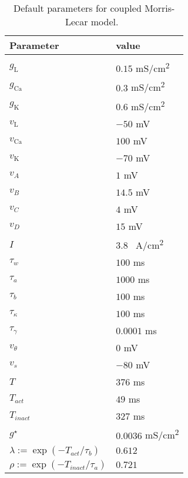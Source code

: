\documentclass[utf8]{frontiers_suppmat} %
\renewcommand{\k}{\mathrm{K}}
\newcommand{\ca}{\mathrm{Ca}}
\newcommand{\leak}{\mathrm{L}}
\newcommand{\gstar}{g^\star}
\begin{document}
\begin{table}[h]
	\caption{Default parameters for coupled Morris-Lecar model.~\label{tab:pars}}
	\centering
	\begin{tabular}{ll}
		Parameter                        & value                 \\
		\hline
		                                 &                       \\
		$g_{\leak}$                      & $0.15$ \si{mS/cm^2}   \\
		$g_{\ca}$                        & $0.3$ \si{mS/cm^2}    \\
		$g_{\k}$                         & $0.6$ \si{mS/cm^2}    \\
		$v_{\leak}$                      & $-50$ \si{mV}         \\
		$v_{\ca}$                        & $100$ \si{mV}         \\
		$v_{\k}$                         & $-70$ \si{mV}         \\
		$v_{A}$                          & $1$ \si{mV}           \\
		$v_{B}$                          & $14.5$ \si{mV}        \\
		$v_{C}$                          & $4$ \si{mV}           \\
		$v_{D}$                          & $15$ \si{mV}          \\
		$I$                              & $3.8$ \si{\mu A/cm^2} \\
		$\tau_w$                         & $100$ \si{ms}         \\
		$\tau_a$                         & $1000$ \si{ms}        \\
		$\tau_b$                         & $100$ \si{ms}         \\
		$\tau_\kappa$                    & $100$ \si{ms}         \\
		$\tau_\gamma$                    & $0.0001$ \si{ms}      \\
		$v_{\theta}$                     & $0$ \si{mV}           \\
		$v_{s}$                          & $-80$ \si{mV}         \\
		$T$                              & $376$ \si{ms}         \\
		$T_{act}$                        & $49$ \si{ms}          \\
		$T_{inact}$                      & $327$ \si{ms}         \\
		$\gstar$                         & $0.0036$ \si{mS/cm^2} \\
		$\lambda:=\exp(-T_{act}/\tau_b)$ & $0.612$               \\
		$\rho:=\exp(-T_{inact}/\tau_a)$  & $0.721$               \\
	\end{tabular}
\end{table}
\end{document}
